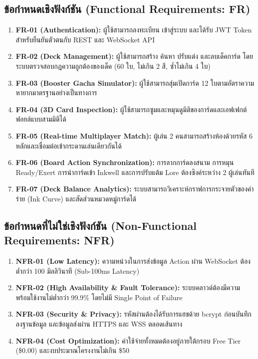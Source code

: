 \documentclass[12pt,a4paper]{report}
\begin{document}
\subsection{ข้อกำหนดเชิงฟังก์ชัน (Functional Requirements: FR)}
\begin{enumerate}
    \item \textbf{FR-01 (Authentication):} ผู้ใช้สามารถลงทะเบียน เข้าสู่ระบบ และได้รับ JWT Token สำหรับยืนยันตัวตนกับ REST และ WebSocket API
    \item \textbf{FR-02 (Deck Management):} ผู้ใช้สามารถสร้าง ค้นหา ปรับแต่ง และลบเด็คการ์ด โดยระบบตรวจสอบกฎความถูกต้องของเด็ค (60 ใบ, ไม่เกิน 2 สี, ซ้ำไม่เกิน 4 ใบ)
    \item \textbf{FR-03 (Booster Gacha Simulator):} ผู้ใช้สามารถสุ่มเปิดการ์ด 12 ใบตามอัตราความหายากมาตรฐานอย่างเป็นทางการ
    \item \textbf{FR-04 (3D Card Inspection):} ผู้ใช้สามารถซูมและหมุนดูมิติของการ์ดและเอฟเฟกต์ฟอยล์แบบสามมิติได้
    \item \textbf{FR-05 (Real-time Multiplayer Match):} ผู้เล่น 2 คนสามารถสร้างห้องด้วยรหัส 6 หลักและเชื่อมต่อเข้ากระดานเล่นเดียวกันได้
    \item \textbf{FR-06 (Board Action Synchronization):} การลากการ์ดลงสนาม การหมุน Ready/Exert การนำการ์ดเข้า Inkwell และการปรับแต้ม Lore ต้องซิงค์ระหว่าง 2 ผู้เล่นทันที
    \item \textbf{FR-07 (Deck Balance Analytics):} ระบบสามารถวิเคราะห์กราฟการกระจายตัวของค่าร่าย (Ink Curve) และสัดส่วนหมวดหมู่การ์ดได้
\end{enumerate}

\subsection{ข้อกำหนดที่ไม่ใช่เชิงฟังก์ชัน (Non-Functional Requirements: NFR)}
\begin{enumerate}
    \item \textbf{NFR-01 (Low Latency):} ความหน่วงในการส่งข้อมูล Action ผ่าน WebSocket ต้องต่ำกว่า 100 มิลลิวินาที (Sub-100ms Latency)
    \item \textbf{NFR-02 (High Availability \& Fault Tolerance):} ระบบคลาวด์ต้องมีความพร้อมใช้งานไม่ต่ำกว่า 99.9\% โดยไม่มี Single Point of Failure
    \item \textbf{NFR-03 (Security \& Privacy):} รหัสผ่านต้องได้รับการแฮชด้วย bcrypt ก่อนบันทึกลงฐานข้อมูล และข้อมูลส่งผ่าน HTTPS และ WSS ตลอดเส้นทาง
    \item \textbf{NFR-04 (Cost Optimization):} ค่าใช้จ่ายทั้งหมดต้องอยู่ภายใต้กรอบ Free Tier (\$0.00) และงบประมาณโครงงานไม่เกิน \$50
\end{enumerate}
\end{document}

